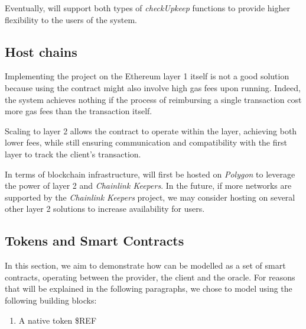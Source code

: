 Eventually, {\projectName} will support both types of \textit{checkUpkeep} functions to provide higher flexibility to the users of the system.


\subsection{Host chains} \label{section:host-chains}
Implementing the project on the Ethereum layer 1 itself is not a good solution because using the contract might also involve high gas fees upon running. Indeed, the system achieves nothing if the process of reimbursing a single transaction cost more gas fees than the transaction itself. 

Scaling \projectName to layer 2 allows the contract to operate within the layer, achieving both lower fees, while still ensuring communication and compatibility with the first layer to track the client's transaction.

In terms of blockchain infrastructure, {\projectName} will first be hosted on \textit{Polygon} to leverage the power of layer 2 and \textit{Chainlink Keepers}. In the future, if more networks are supported by the \textit{Chainlink Keepers} project, we may consider hosting {\projectName}  on several other layer 2 solutions to increase availability for users.


\subsection{{\projectName} Tokens and Smart Contracts} \label{section:tokens}

In this section, we aim to demonstrate how {\projectName} can be modelled as a set of smart contracts, operating between the provider, the client and the oracle. For reasons that will be explained in the following paragraphs, we chose to model {\projectName} using the following building blocks: 
\begin{enumerate}
    \item A native token  \$REF 
\end{enumerate}



